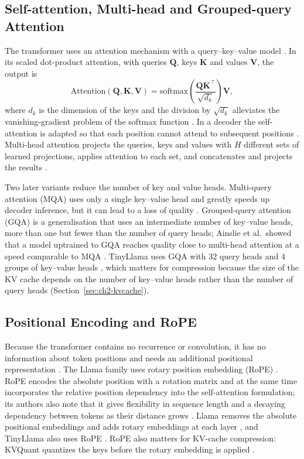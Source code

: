 \subsection{Self-attention, Multi-head and Grouped-query Attention}
\label{sec:ch2-attention}

The transformer uses an attention mechanism with a query--key--value model \cite{lin2021survey}. In its scaled dot-product attention, with queries $\mathbf{Q}$, keys $\mathbf{K}$ and values $\mathbf{V}$, the output is
\begin{equation}
  \mathrm{Attention}(\mathbf{Q}, \mathbf{K}, \mathbf{V}) = \mathrm{softmax}\left( \frac{\mathbf{Q}\mathbf{K}^{\top}}{\sqrt{d_k}} \right) \mathbf{V},
  \label{eq:ch2-attn}
\end{equation}
where $d_k$ is the dimension of the keys and the division by $\sqrt{d_k}$ alleviates the vanishing-gradient problem of the softmax function \cite{lin2021survey}. In a decoder the self-attention is adapted so that each position cannot attend to subsequent positions \cite{lin2021survey}. Multi-head attention projects the queries, keys and values with $H$ different sets of learned projections, applies attention to each set, and concatenates and projects the results \cite{lin2021survey}.

Two later variants reduce the number of key and value heads. Multi-query attention (MQA) uses only a single key--value head and greatly speeds up decoder inference, but it can lead to a loss of quality \cite{ainslie2023gqa}. Grouped-query attention (GQA) is a generalisation that uses an intermediate number of key--value heads, more than one but fewer than the number of query heads; Ainslie et al.\ showed that a model uptrained to GQA reaches quality close to multi-head attention at a speed comparable to MQA \cite{ainslie2023gqa}. TinyLlama uses GQA with 32 query heads and 4 groups of key--value heads \cite{zhang2024tinyllama}, which matters for compression because the size of the KV cache depends on the number of key--value heads rather than the number of query heads (Section~\ref{sec:ch2-kvcache}).

\subsection{Positional Encoding and RoPE}
\label{sec:ch2-rope}

Because the transformer contains no recurrence or convolution, it has no information about token positions and needs an additional positional representation \cite{lin2021survey}. The Llama family uses rotary position embedding (RoPE) \cite{touvron2023llama}. RoPE encodes the absolute position with a rotation matrix and at the same time incorporates the relative position dependency into the self-attention formulation; its authors also note that it gives flexibility in sequence length and a decaying dependency between tokens as their distance grows \cite{su2023roformer}. Llama removes the absolute positional embeddings and adds rotary embeddings at each layer \cite{touvron2023llama}, and TinyLlama also uses RoPE \cite{zhang2024tinyllama}. RoPE also matters for KV-cache compression: KVQuant quantizes the keys before the rotary embedding is applied \cite{hooper2024kvquant}.

